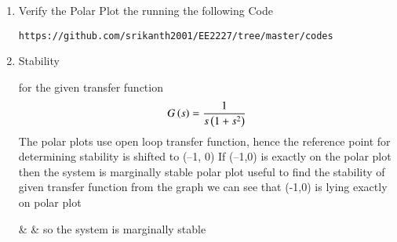 \begin{enumerate}[label=\thesection.\arabic*.,ref=\thesection.\theenumi]
\item
Verify the Polar Plot the running the following Code
\begin{lstlisting}
https://github.com/srikanth2001/EE2227/tree/master/codes
\end{lstlisting}

\item
 Stability

\break for the given transfer function 
\begin{align}
    G\left(s\right) = \frac{1}{s\left(1+s^{2}\right)}
\end{align}
The polar plots use open loop transfer function, hence the reference point for determining
stability is shifted to (–1, 0)
\center
 If (–1,0) is exactly on the polar plot then the system is marginally stable
polar plot useful to find the stability of given transfer function
from the graph we can see that (-1,0) is lying exactly on polar plot

&
&
\center so the system is marginally stable
\end{enumerate}
